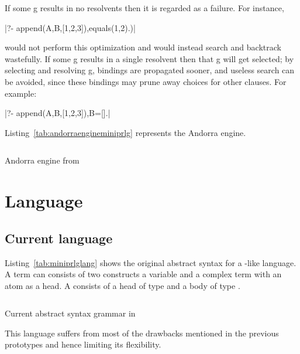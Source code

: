 \documentclass[thesis-solanki.tex]{files}
\begin{document}
If some g results in no resolvents then it is regarded as a failure. For instance,

|?- append(A,B,[1,2,3]),equals(1,2).)|

 would not perform this optimization and would instead search and backtrack wastefully.  
If some g results in a single resolvent then that g will get selected;
by selecting and resolving g, bindings are propagated sooner, and useless
search can be avoided, since these bindings may prune away choices for
other clauses.  For example: 

|?- append(A,B,[1,2,3]),B=[].|

Listing~\ref{tab:andorraengineminiprlg} represents the Andorra engine.

\begin{code-list}[H]
\begin{singlespace}
\inputminted[linenos, firstline=29, lastline=64]{haskell}{haskell-proto3-diatomic-unbank.hs}
\end{singlespace}
\caption{Andorra engine from \cite{website:mini-prolog-hugs98}}
\label{tab:andorraengineminiprlg}
\end{code-list}


\section{Language}
\subsection{Current language}
Listing~\ref{tab:miniprlglang} shows the original abstract syntax for a -like language.
A  term can consists of two constructs a variable and a complex term with an atom as a head. A  consists 
of a head of type and a body of type \haskellConstruct{[Term]}. 

\begin{code-list}[H]
\begin{singlespace}
  \inputminted[linenos, firstline=24, lastline=37]{haskell}{haskell-proto3-butter-chicken.hs}
\end{singlespace}
\caption{Current abstract syntax grammar in \cite{website:mini-prolog-hugs98}}
\label{tab:miniprlglang}
\end{code-list}

This language suffers from most of the drawbacks mentioned in the previous prototypes and hence limiting its flexibility.
\end{document}

